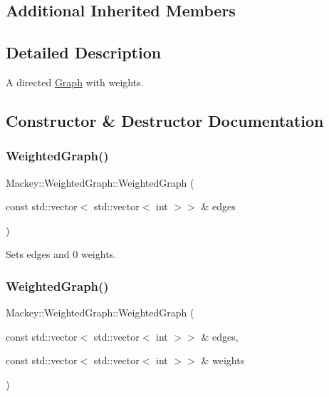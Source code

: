 \subsection*{Additional Inherited Members}


\subsection{Detailed Description}
A directed \hyperlink{classMackey_1_1Graph}{Graph} with weights. 

\subsection{Constructor \& Destructor Documentation}
\mbox{\label{classMackey_1_1WeightedGraph_a7d1167cb1c379843cd2845757037d217}} 
\subsubsection{\texorpdfstring{Weighted\+Graph()}{WeightedGraph()}\hspace{0.1cm}{\footnotesize\ttfamily [1/2]}}
{\footnotesize\ttfamily Mackey\+::\+Weighted\+Graph\+::\+Weighted\+Graph (\begin{DoxyParamCaption}\item[{const std\+::vector$<$ std\+::vector$<$ int $>$$>$ \&}]{edges }\end{DoxyParamCaption})\hspace{0.3cm}{\ttfamily [inline]}}



Sets edges and 0 weights. 

\mbox{\label{classMackey_1_1WeightedGraph_a5949ba99b50db23d59c124a4ff9a3072}} 
\subsubsection{\texorpdfstring{Weighted\+Graph()}{WeightedGraph()}\hspace{0.1cm}{\footnotesize\ttfamily [2/2]}}
{\footnotesize\ttfamily Mackey\+::\+Weighted\+Graph\+::\+Weighted\+Graph (\begin{DoxyParamCaption}\item[{const std\+::vector$<$ std\+::vector$<$ int $>$$>$ \&}]{edges,  }\item[{const std\+::vector$<$ std\+::vector$<$ int $>$$>$ \&}]{weights }\end{DoxyParamCaption})\hspace{0.3cm}{\ttfamily [inline]}}



